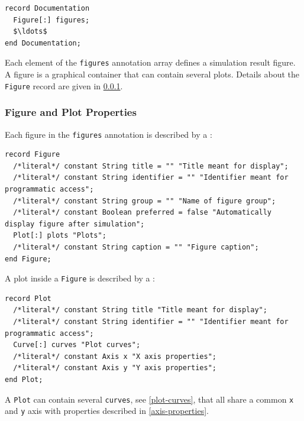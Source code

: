 \begin{annotationdefinition*}[figures]\label{modelica:Documentation.figures}
\begin{synopsis}\begin{lstlisting}
record Documentation
  Figure[:] figures;
  $\ldots$
end Documentation;
\end{lstlisting}\end{synopsis}
\begin{semantics}
Each element of the \lstinline!figures! annotation array defines a simulation result figure.
A figure is a graphical container that can contain several plots.
Details about the \lstinline!Figure! record are given in \cref{figure-plot-properties}.
\end{semantics}
\end{annotationdefinition*}

\subsubsection{Figure and Plot Properties}\label{figure-plot-properties}

Each figure in the \lstinline!figures! annotation is described by a :
\begin{lstlisting}[language=modelica]
record Figure
  /*literal*/ constant String title = "" "Title meant for display";
  /*literal*/ constant String identifier = "" "Identifier meant for programmatic access";
  /*literal*/ constant String group = "" "Name of figure group";
  /*literal*/ constant Boolean preferred = false "Automatically display figure after simulation";
  Plot[:] plots "Plots";
  /*literal*/ constant String caption = "" "Figure caption";
end Figure;
\end{lstlisting}

A plot inside a \lstinline!Figure! is described by a :
\begin{lstlisting}[language=modelica]
record Plot
  /*literal*/ constant String title "Title meant for display";
  /*literal*/ constant String identifier = "" "Identifier meant for programmatic access";
  Curve[:] curves "Plot curves";
  /*literal*/ constant Axis x "X axis properties";
  /*literal*/ constant Axis y "Y axis properties";
end Plot;
\end{lstlisting}

A \lstinline!Plot! can contain several \lstinline!curves!, see \cref{plot-curves}, that all share a common \lstinline!x! and \lstinline!y! axis with properties described in \cref{axis-properties}.


